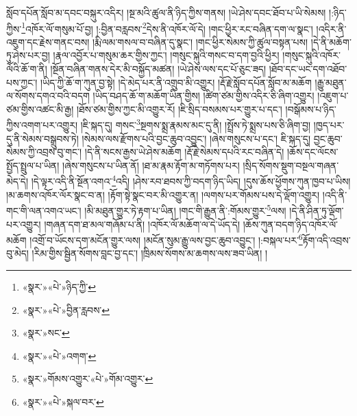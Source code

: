 སློབ་དཔོན་སློབ་མ་དབང་བསྐུར་འདིར། །སྔ་མའི་ཚུལ་ནི་ཉིད་ཀྱིས་གནས། །ཡེ་ཤེས་དབང་ཐོབ་པ་ཡི་སེམས། །:ཉིད་ཀྱིས་\footnote{«སྣར་»«པེ་»ཉིད་ཀྱི་}འཁོར་ལོ་གསུམ་པོ་བྱ། །:བྱིན་བརླབས་\footnote{«སྣར་»«པེ་»བྱིན་རླབས་}དེས་ནི་འཁོར་ལོ་དེ། །གང་ཕྱིར་རང་བཞིན་དག་ལ་སྣང་། །འདིར་ནི་འཇུག་དང་རྗེས་གནང་བས། །རྨི་ལམ་གསལ་བ་བཞིན་དུ་སྣང་། །གང་ཕྱིར་སེམས་ཀྱི་ཚུལ་བསྟན་པས། །དེ་ནི་མཆོག་ཏུ་ཤེས་པར་བྱ། །རྣལ་འབྱོར་པ་གསུམ་ཆར་གྱིས་ཀྱང་། །གསུང་སྐུའི་གསང་བ་དག་བྱའི་ཕྱིར། །གསུང་སྐུའི་འཁོར་ལོའི་ཆོ་ག་ནི། །སྔོན་བཞིན་གནས་དེར་མི་བསྐྱོད་མཚན། །ཡེ་ཤེས་ལས་དང་པོ་ཅུང་ཟད། །ཐོབ་དང་ཡང་དག་འཐོབ་པས་ཀྱང་། །ཡིད་ཀྱི་ཆོ་ག་ཀུན་བྱ་སྟེ། །དེ་མེད་པར་ནི་འགྲུབ་མི་འགྱུར། །རྡོ་རྗེ་སློབ་དཔོན་སློབ་མ་མཆོག །རྒྱུ་མཐུན་ལ་སོགས་དགའ་བའི་བདག །ཡིད་བཤད་ཆོ་ག་མཆོག་ཡིན་གྱིས། །ཚིག་ཙམ་གྱིས་འདིར་ཅི་ཞིག་འགྱུར། །འཇུག་པ་ཙམ་གྱིས་འཚང་མི་རྒྱ། །ཐོས་ཙམ་གྱིས་ཀྱང་མི་འགྱུར་རོ། །ཇི་སྲིད་བསམས་པར་གྱུར་པ་དང་། །བསྒོམས་པ་ཉིད་ཀྱིས་འགག་པར་འགྱུར། །ཇི་སྐད་དུ། གསང་\footnote{«སྣར་»སང་}སྔགས་སྨྲ་རྣམས་མང་དུ་ནི། །སྤྲོས་ཏེ་སྨྲས་པས་ཅི་ཞིག་བྱ། །ཁྱད་པར་དུ་ནི་སེམས་བསྒྲུབས་ཏེ། །སེམས་ལས་རྫོགས་པའི་བྱང་ཆུབ་འབྱུང་། །ཞེས་གསུངས་པ་དང་། ཇི་སྐད་དུ། བྱང་ཆུབ་སེམས་ཀྱི་འབྲས་བུ་གང་། །དེ་ནི་སངས་རྒྱས་ཡེ་ཤེས་མཆོག །རྡོ་རྗེ་སེམས་དཔའི་རང་བཞིན་དེ། །ཆོས་དང་ལོངས་སྤྱོད་སྤྲུལ་པ་ཡིན། །ཞེས་གསུངས་པ་ཡིན་ནོ། །ཐ་མ་རྣམ་རྟོག་མ་གཏོགས་པར། །སྲིད་སོགས་སྡུག་བསྔལ་གཞན་མེད་དེ། །དེ་ལྟར་འདི་ནི་སྔོན་འགའ་\footnote{«སྣར་»«པེ་»འགག་}འདི། །ཤེས་རབ་ཐབས་ཀྱི་བདག་ཉིད་ཡིད། །དུས་ཆོས་ཕྱོགས་ཀུན་ཁྱབ་པ་ཡིས། །མ་ཆགས་འཁོར་ལོར་སྣང་བ་ན། །རྟོག་སྟེ་སྣང་བར་མི་འགྱུར་ན། །ལགས་པར་གོམས་པས་དེ་ལྡོག་འགྱུར། །འདི་ནི་གང་གི་ལན་འགའ་ཡང་། །མི་མཐུན་གྱུར་ཏེ་རྟག་པ་ཡིན། །གང་གི་རྒྱུན་ནི་:གོམས་གྱུར་\footnote{«སྣར་»གོམས་འགྱུར་«པེ་»གོམ་འགྱུར་}ལས། །དེ་ནི་ཤིན་ཏུ་ལྡོག་པར་འགྱུར། །གཞན་དག་ཐ་མལ་གཞོམ་པ་ནི། །འཁོར་ལོ་མཆོག་ལ་དེ་ཡོད་དེ། །ཆོས་ཀུན་བདག་ཉིད་འཁོར་ལོ་མཆོག །འགྲོ་བ་ཡོངས་དག་མངོན་གྱུར་ལས། །མངོན་སུམ་རྒྱུ་ལས་བྱང་ཆུབ་འབྱུང་། །:བསྐལ་པར་\footnote{«སྣར་»«པེ་»སྐལ་བར་}རྟོག་འདི་འབྲས་བུ་མེད། །རིམ་གྱིས་སྦྱིན་སོགས་བླང་བྱ་དང་། །ཁྲིམས་སོགས་མ་ཆགས་ལས་ཟབ་ཡིན། །

